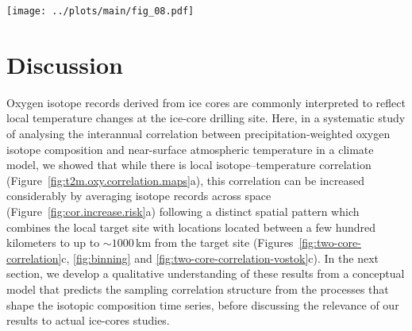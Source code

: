 \documentclass[draft]{agujournal2019}
\begin{document}
\begin{figure*}[t]%
\centering
\texttt{[image: ../plots/main/fig\_08.pdf]}
\caption{%
  Gain in correlation and risk of adverse sampling. (a) The average correlation
  with the target temperature at the EDML (red) and Vostok (blue) sites
  depending on the number of locations, $N$, used for averaging the
  $\delta^{18}\mathrm{O}^{\mathrm{(pw)}}$ time series. Sampling is performed
  either locally from the innermost ring only (dashed lines), or from all
  possible individual combinations of locations for the respective optimal ring
  combination determined for each $N$ (solid lines). Compared to the local
  samples which show virtually no increase with the number of sampled locations,
  the correlation increases markedly with $N$ when sampling from the optimal
  rings, as highlighted by the shaded area. (b) Histogram of individual
  correlations for sampling from the optimal ring combination when averaging
  $N=3$ locations compared to the correlation (vertical lines) for sampling from
  the innermost ring only, displayed for the EDML (red) and Vostok (blue) target
  sites. For more than $90\,\%$ of the optimal ring combination samples, the
  correlation is higher than the local value.}
\label{fig:cor.increase.risk}%
\end{figure*}%

\section{Discussion}\label{discussion}

Oxygen isotope records derived from ice cores are commonly interpreted to
reflect local temperature changes at the ice-core drilling site. Here, in a
systematic study of analysing the interannual correlation between
precipitation-weighted oxygen isotope composition and near-surface atmospheric
temperature in a climate model, we showed that while there is local
isotope--temperature correlation (Figure~\ref{fig:t2m.oxy.correlation.maps}a),
this correlation can be increased considerably by averaging isotope records
across space (Figure~\ref{fig:cor.increase.risk}a) following a distinct spatial
pattern which combines the local target site with locations located between a
few hundred kilometers to up to $\sim1000$\,km from the target site
(Figures~\ref{fig:two-core-correlation}c, \ref{fig:binning} and
\ref{fig:two-core-correlation-vostok}c). In the next section, we develop a
qualitative understanding of these results from a conceptual model that predicts
the sampling correlation structure from the processes that shape the isotopic
composition time series, before discussing the relevance of our results to
actual ice-cores studies.
\end{document}
